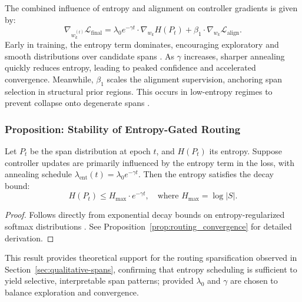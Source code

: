 The combined influence of entropy and alignment on controller gradients is given by:
\begin{equation}
\nabla_{w_k^{(t)}} \mathcal{L}_{\text{final}} = \lambda_0 e^{-\gamma t} \cdot \nabla_{w_k} H(P_t) + \beta_1 \cdot \nabla_{w_k} \mathcal{L}_{\text{align}}.
\label{eq:gradient_flow}
\end{equation}
Early in training, the entropy term dominates, encouraging exploratory and smooth distributions over candidate spans \cite{pereyra2017regularizing}. As \(\gamma\) increases, sharper annealing quickly reduces entropy, leading to peaked confidence and accelerated convergence. Meanwhile, \(\beta_1\) scales the alignment supervision, anchoring span selection in structural prior regions. This occurs in low-entropy regimes to prevent collapse onto degenerate spans \cite{liu2024structured}.

\subsubsection*{Proposition: Stability of Entropy-Gated Routing}

\begin{proposition}
\label{prop:annealing}
Let \(P_t\) be the span distribution at epoch \(t\), and \(H(P_t)\) its entropy. Suppose controller updates are primarily influenced by the entropy term in the loss, with annealing schedule \(\lambda_{\mathrm{ent}}(t) = \lambda_0 e^{-\gamma t}\). Then the entropy satisfies the decay bound:
\begin{equation}
H(P_t) \leq H_{\max} \cdot e^{-\gamma t}, \quad \text{where } H_{\max} = \log |S|.
\label{eq:entropy_bound}
\end{equation}
\end{proposition}

\begin{proof}
Follows directly from exponential decay bounds on entropy-regularized softmax distributions \cite{grandvalet2006entropy}. See Proposition~\ref{prop:routing_convergence} for detailed derivation.
\end{proof}

This result provides theoretical support for the routing sparsification observed in Section~\ref{sec:qualitative-spans}, confirming that entropy scheduling is sufficient to yield selective, interpretable span patterns; provided \(\lambda_0\) and \(\gamma\) are chosen to balance exploration and convergence.









